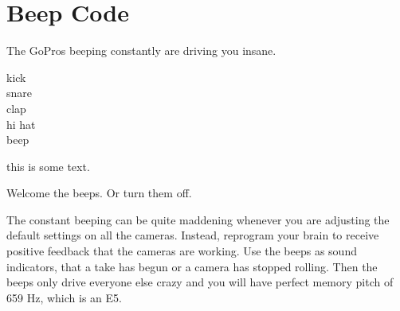 \chapter{Beep Code}
\pagecolor{white}
\label{chap:17}
\begin{fullwidth}

\problem

{\large The GoPros beeping constantly are driving you insane. \par}

kick
\\
snare
\\
clap
\\
hi hat
\\
beep

this is some text.

\solution

{\large Welcome the beeps. Or turn them off. \par}

The constant beeping can be quite maddening whenever you are adjusting the default settings on all the cameras. Instead, reprogram your brain to receive positive feedback that the cameras are working. Use the beeps as sound indicators, that a take has begun or a camera has stopped rolling. Then the beeps only drive everyone else crazy and you will have perfect memory pitch of 659 Hz, which is an E5.






\clearpage
\end{fullwidth}
